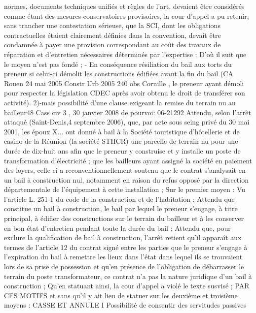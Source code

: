 \documentclass[11pt,a4paper]{report}
\begin{document}
	normes, documents techniques unifiés et règles de l'art, devaient être considérés comme étant des mesures
	conservatoires provisoires, la cour d'appel a pu retenir, sans trancher une contestation sérieuse, que la SCI,
	dont les obligations contractuelles étaient clairement définies dans la convention, devait être condamnée à payer
	une provision correspondant au coût des travaux de réparation et d'entretien nécessaires déterminés par
	l'expertise ;
	D'où il suit que le moyen n'est pas fondé ;
	- En conséquence résiliation du bail aux torts du preneur si celui-ci démolit les constructions édifiées avant la fin
	du bail (CA Rouen 24 mai 2005 Constr Urb 2005 240 obs Cornille , le preneur ayant démoli pour respecter la
	législation CDEC après avoir obtenu le droit de transférer son activité).
	2)-mais possibilité d’une clause exigeant la remise du terrain nu au bailleur48
	Cass civ 3 , 30 janvier 2008 \No  de pourvoi: 06-21292
	Attendu, selon l'arrêt attaqué (Saint-Denis,4 septembre 2006), que, par acte sous seing privé du 30 mai 2001, les
	époux X... ont donné à bail à la Société touristique d'hôtellerie et de casino de la Réunion (la société STHCR)
	une parcelle de terrain nu pour une durée de dix-huit ans afin que le preneur y construise et y installe un poste
	de transformation d'électricité ; que les bailleurs ayant assigné la société en paiement des loyers, celle-ci a
	reconventionnellement soutenu que le contrat s'analysait en un bail à construction nul, notamment en raison du
	refus opposé par la direction départementale de l'équipement à cette installation ;
	Sur le premier moyen :
	Vu l'article L. 251-1 du code de la construction et de l'habitation ;
	Attendu que constitue un bail à construction, le bail par lequel le preneur s'engage, à titre principal, à édifier
	des constructions sur le terrain du bailleur et à les conserver en bon état d'entretien pendant toute la durée du
	bail ;
	Attendu que, pour exclure la qualification de bail à construction, l'arrêt retient qu'il apparaît aux termes de
	l'article 12 du contrat signé entre les parties que le preneur s'engage à l'expiration du bail à remettre les lieux
	dans l'état dans lequel ils se trouvaient lors de sa prise de possession et qu'en présence de l'obligation de
	débarrasser le terrain du poste transformateur, ce contrat n'a pas la nature juridique d'un bail à construction ;
	Qu'en statuant ainsi, la cour d'appel a violé le texte susvisé ;
	PAR CES MOTIFS et sans qu'il y ait lieu de statuer sur les deuxième et troisième moyens :
	CASSE ET ANNULE
	I Possibilité de consentir des servitudes passives
\end{document}
